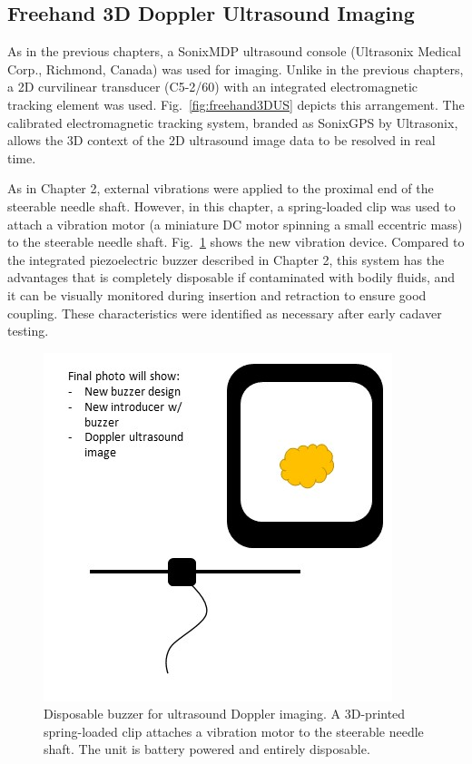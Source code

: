 \subsection{Freehand 3D Doppler Ultrasound Imaging}
As in the previous chapters, a SonixMDP ultrasound console (Ultrasonix Medical Corp., Richmond, Canada) was used for imaging. Unlike in the previous chapters, a 2D curvilinear transducer (C5-2/60) with an integrated electromagnetic tracking element was used. Fig.~\ref{fig:freehand3DUS} depicts this arrangement. The calibrated electromagnetic tracking system, branded as SonixGPS by Ultrasonix, allows the 3D context of the 2D ultrasound image data to be resolved in real time. 

As in Chapter 2, external vibrations were applied to the proximal end of the steerable needle shaft. However, in this chapter, a spring-loaded clip was used to attach a vibration motor (a miniature DC motor spinning a small eccentric mass) to the steerable needle shaft. Fig.~\ref{fig:Buzzer} shows the new vibration device. Compared to the integrated piezoelectric buzzer described in Chapter 2, this system has the advantages that is completely disposable if contaminated with bodily fluids, and it can be visually monitored during insertion and retraction to ensure good coupling. These characteristics were identified as necessary after early cadaver testing.

\begin{figure}[!t]
\centering
\includegraphics[width = 0.4\columnwidth]{./Images/Chapter5/Buzzer/DRAFTBuzzer.jpg}%
\caption[Disposable buzzer]{Disposable buzzer for ultrasound Doppler imaging. A 3D-printed spring-loaded clip attaches a vibration motor to the steerable needle shaft. The unit is battery powered and entirely disposable.}
\label{fig:Buzzer}
\end{figure}  

